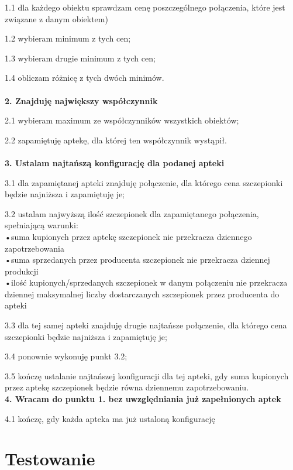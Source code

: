 \documentclass[]{article}
\begin{document}
    1.1 dla każdego obiektu sprawdzam cenę poszczególnego połączenia, które jest związane z danym obiektem)
    
    1.2 wybieram minimum z tych cen;
    
    1.3 wybieram drugie minimum z tych cen;
    
    1.4 obliczam różnicę z tych dwóch minimów.\\\\ 
    \textbf{2. Znajduję największy współczynnik}
    
    2.1 wybieram maximum ze współczynników wszystkich obiektów;
    
    2.2 zapamiętuję aptekę, dla której ten współczynnik wystąpił.\\\\
    \textbf{3. Ustalam najtańszą konfigurację dla podanej apteki}
    
    3.1 dla zapamiętanej apteki znajduję połączenie, dla którego cena szczepionki będzie najniższa i zapamiętuję je;
    
    3.2 ustalam najwyższą ilość szczepionek dla zapamiętanego połączenia, spełniającą warunki:\\
    \tab •suma kupionych przez aptekę szczepionek nie przekracza dziennego \\\tab zapotrzebowania\\
    \tab •suma sprzedanych przez producenta szczepionek nie przekracza dziennej produkcji\\
     \tab •ilość kupionych/sprzedanych szczepionek w danym połączeniu nie przekracza\\\tab  dziennej maksymalnej liczby dostarczanych szczepionek przez producenta do apteki
     
     3.3 dla tej samej apteki znajduję drugie najtańsze połączenie, dla którego cena szczepionki będzie najniższa i zapamiętuję je;
     
     3.4 ponownie wykonuję punkt 3.2;
     
     3.5 kończę ustalanie najtańszej konfiguracji dla tej apteki, gdy suma kupionych przez aptekę szczepionek będzie równa dziennemu zapotrzebowaniu.\\
     \textbf{4. Wracam do punktu 1.  bez uwzględniania już zapełnionych aptek}
     
     4.1 kończę, gdy każda apteka ma już ustaloną konfigurację
     
     
    \section{Testowanie}
 
\end{document}
